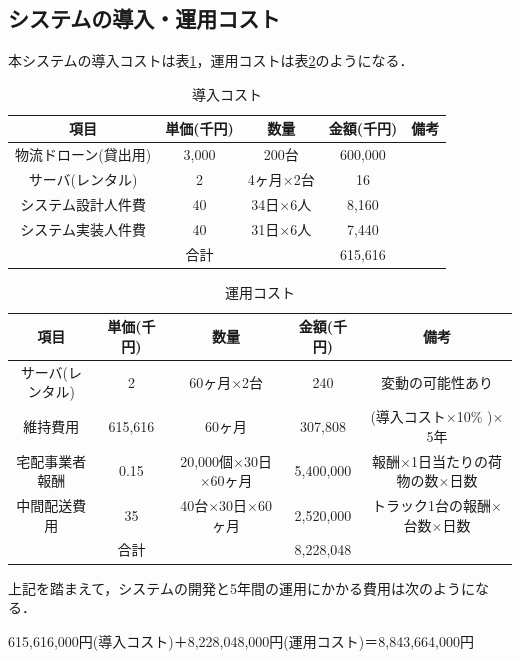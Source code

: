 \documentclass[a4paper, titlepage]{jsarticle}
\begin{document}
\subsection{システムの導入・運用コスト}
本システムの導入コストは表\ref{tab:label1}，運用コストは表\ref{tab:label2}のようになる．
\begin{table}[H]
  \centering
  \caption{導入コスト}
  \begin{tabular}{c c c c c}
    \hline
    項目 & 単価(千円) & 数量 & 金額(千円) & 備考 \\
    \hline \hline
    物流ドローン(貸出用) & 3,000 & 200台 & 600,000 & \\
    サーバ(レンタル) & 2 & 4ヶ月$\times$2台 & 16 & \\
    システム設計人件費 & 40 & 34日$\times$6人 & 8,160 & \\
    システム実装人件費 & 40 & 31日$\times$6人 & 7,440 & \\
    \hline \hline
    & 合計 & & 615,616 & \\
    \hline
  \end{tabular}
  \label{tab:label1}
\end{table}

\begin{table}[H]
  \centering
  \caption{運用コスト}
  \begin{tabular}{c c c c c}
    \hline
    項目 & 単価(千円) & 数量 & 金額(千円) & 備考 \\
    \hline \hline
    サーバ(レンタル) & 2 & 60ヶ月$\times$2台 & 240 & 変動の可能性あり \\
    維持費用 & 615,616 & 60ヶ月 & 307,808 & (導入コスト$\times$10\% )$\times$5年 \\
    宅配事業者報酬 & 0.15 & 20,000個$\times$30日$\times$60ヶ月 & 5,400,000 & 報酬$\times$1日当たりの荷物の数$\times$日数 \\
    中間配送費用 & 35 & 40台$\times$30日$\times$60ヶ月 & 2,520,000 & トラック1台の報酬$\times$台数$\times$日数 \\
    \hline \hline
    & 合計 & & 8,228,048 & \\
    \hline
  \end{tabular}
  \label{tab:label2}
\end{table}

上記を踏まえて，システムの開発と5年間の運用にかかる費用は次のようになる．
\begin{center}
  615,616,000円(導入コスト)＋8,228,048,000円(運用コスト)＝8,843,664,000円
\end{center}
\end{document}
